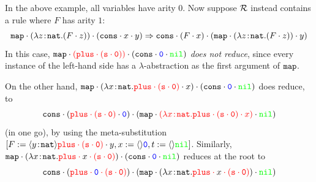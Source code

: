 \begin{example}
In the above example, all variables have arity $0$.  Now suppose $\mathcal{R}$ instead contains a rule
where $F$ has arity $1$:
\[
\mathtt{map} \cdot (\lambda z\!:\!\mathtt{nat}.(F \cdot z)) \cdot (\mathtt{cons} \cdot x \cdot y) \Rightarrow
\mathtt{cons} \cdot (F \cdot x) \cdot (\mathtt{map} \cdot (\lambda z\!:\!\mathtt{nat}.(F \cdot z)) \cdot y)
\]
In this case, $\mathtt{map} \cdot \textcolor{red}{(\mathtt{plus} \cdot (\mathtt{s} \cdot \mathtt{0}))} \cdot (\mathtt{cons} \cdot \textcolor{blue}{\mathtt{0}} \cdot \textcolor{green}{\mathtt{nil}})$
\emph{does not reduce}, since every instance of the left-hand side has a $\lambda$-abstraction as the first argument of $\mathtt{map}$.

On the other hand,
$\app{
  \app{
    \symb{map}
  }{
    (\abs{\avar}{\nat}{
      \app{\textcolor{red}{\app{
        \symb{plus}
      }{
        (\app{\suc}{\nul})
      }}}{
        \avar
      }
    })
  }
}{
  (\app{\app{\cons}{\textcolor{blue}{\nul}}}{\textcolor{green}{\nil}})
}$
does reduce, to
\[
  \app{
    \app{
      \cons
    }{(
      \app{
        \textcolor{red}{
            \app{
              \symb{plus}
            }{
              (\app{\suc}{\nul})
            }
        }
      }{
        \textcolor{blue}{\nul}
      }
    )}
  }{
    (\app{
      \app{
        \symb{map}
      }{
        \textcolor{red}{
          (\abs{\avar}{\nat}{
            \app{\app{
              \symb{plus}
            }{
              (\app{\suc}{\nul})
            }}{
              \avar
            }
          })
        }
      }
    }{
      \textcolor{green}{\nil}
    })
  }
\]
(in one go), by using the meta-substitution
$[F:=\langle y\!:\!\mathtt{nat}\rangle\textcolor{red}{\mathtt{plus} \cdot (\mathtt{s} \cdot \mathtt{0})} \cdot y,
  x:=\langle \rangle\textcolor{blue}{\mathtt{0}},t:=\langle \rangle\textcolor{green}{\mathtt{nil}}]$.
Similarly, 
$\app{
  \app{
    \symb{map}
  }{
    (\abs{\avar}{\nat}{
      \textcolor{red}{\app{
        \app{\symb{plus}}{\textcolor{black}{\avar}}}{
        (\app{\suc}{\nul})
      }}
    })
  }
}{
  (\app{\app{\cons}{\textcolor{blue}{\nul}}}{\textcolor{green}{\nil}})
}$
reduces at the root to
\[
  \app{
    \app{
      \cons
    }{(
      \textcolor{red}{
        \app{
          \app{\symb{plus}}{\textcolor{blue}{\nul}}
        }{(\app{\suc}{\nul})}
        }
    )}
  }{
    (\app{
      \app{
        \symb{map}
      }{
        (\abs{\avar}{\nat}{
          \textcolor{red}{
            \app{\app{
              \symb{plus}
            }{
              \textcolor{black}{\avar}
            }}{
              (\app{\suc}{\nul})
            }
          }
        })
      }
    }{
      \textcolor{green}{\nil}
    })
  }
\]
\end{example}

